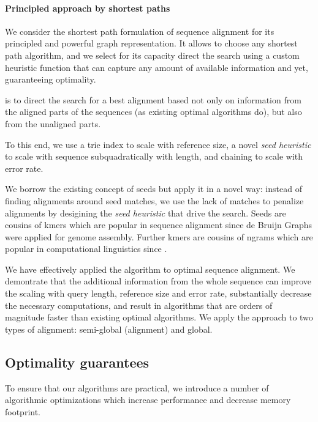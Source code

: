 \paragraph{Principled approach by shortest paths}

We consider the shortest path formulation of sequence alignment for its
principled and powerful graph representation. It allows to choose any shortest
path algorithm, and we select \A for its capacity direct the search using a
custom heuristic function that can capture any amount of available information
and yet, guaranteeing optimality.

 is to direct the search for a best alignment based not only on information
from the aligned parts of the sequences (as existing optimal algorithms do), but
also from the unaligned parts. 

To this end, we use a trie index to scale with reference size, a novel
\emph{seed heuristic} to scale with sequence subquadratically with length, and
chaining to scale with error rate.

We borrow the existing concept of seeds but apply it in a novel way: instead of
finding alignments around seed matches, we use the lack of matches to penalize
alignments by desigining the \emph{seed heuristic} that drive the \A search.
Seeds are cousins of kmers which are popular in sequence alignment since de
Bruijn Graphs were applied for genome assembly. Further kmers are cousins of
ngrams which are popular in computational linguistics since .

We have effectively applied the \A algorithm to optimal sequence alignment. We
demontrate that the additional information from the whole sequence can improve
the scaling with query length, reference size and error rate, substantially
decrease the necessary computations, and result in algorithms that are orders of
magnitude faster than existing optimal algorithms. We apply the \A approach to
two types of alignment: semi-global (alignment) and global.



\subsection*{Optimality guarantees}
To ensure that our algorithms are practical, we introduce a number of
algorithmic optimizations which increase performance and decrease memory
footprint.

